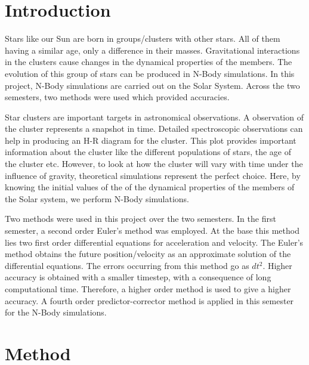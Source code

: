 \documentclass[11pt]{article}
\begin{document}
\section{\textbf{Introduction}}
{\normalsize{Stars like our Sun are born in groups/clusters with other stars. All of them having a similar age, only a difference in their masses. Gravitational interactions in the clusters cause changes in the dynamical properties of the members. The evolution of this group of stars can be produced in N-Body simulations. In this project, N-Body simulations are carried out on the Solar System. Across the two semesters, two methods were used which provided accuracies. 

\medskip

Star clusters are important targets in astronomical observations. A observation of the cluster represents a snapshot in time. Detailed spectroscopic observations can help in producing an H-R diagram for the cluster. This plot provides important information about the cluster like the different populations of stars, the age of the cluster etc. However, to look at how the cluster will vary with time under the influence of gravity, theoretical simulations represent the perfect choice. Here, by knowing the initial values of the of the dynamical properties of the members of the Solar system, we perform N-Body simulations.

\medskip

Two methods were used in this project over the two semesters. In the first semester, a second order Euler's method was employed. At the base this method lies two first order differential equations for acceleration and velocity. The Euler's method obtains the future position/velocity as an approximate solution of the differential equations. The errors occurring from this method go as $dt$$^{2}$. Higher accuracy is obtained with a smaller timestep, with a consequence of long computational time. Therefore, a higher order method is used to give a higher accuracy. A fourth order predictor-corrector method is applied in this semester for the N-Body simulations.}}

\bigskip

\section{Method}
\medskip
\end{document}
